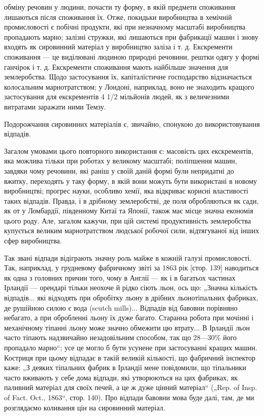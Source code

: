 обміну речовин у людини, почасти ту форму, в якій предмети
споживання лишаються після споживання їх. Отже, покидьки
виробництва в хемічній промисловості є побічні продукти, які
при незначному масштабі виробництва пропадають марно; залізні
стружки, які лишаються при фабрикації машин і знову входять
як сировинний матеріал у виробництво заліза і т. д. Екскременти споживання — це виділювані людиною
природні речовини,
рештки одягу у формі ганчірок і т. д. Екскременти споживання
мають найбільше значення для землеробства. Щодо застосування
їх, капіталістичне господарство відзначається колосальним марнотратством; у Лондоні, наприклад, воно
не знаходить кращого
застосування для екскрементів 4 1/2 мільйонів людей, як з величезними витратами заражати ними Темзу.

Подорожчання сировинних матеріалів є, звичайно, спонукою
до використовування відпадів.

Загалом умовами цього повторного використання є: масовість
цих екскрементів, яка можлива тільки при роботах у великому
масштабі; поліпшення машин, завдяки чому речовини, які раніш
у своїй даній формі були непридатні до вжитку, переходять
у таку форму, в якій вони можуть бути використані в новому
виробництві; прогрес науки, особливо хемії, яка відкриває корисні властивості таких відпадів.
Правда, і в дрібному землеробстві, де поля обробляються як сади, як от у Ломбардії, південному Китаї
та Японії, також має місце значна економія
цього роду. Але, загалом кажучи, при цій системі продуктивність землеробства купується великим
марнотратством людської робочої сили, відтягуваної від інших сфер виробництва.

Так звані відпади відіграють значну роль майже в кожній
галузі промисловості. Так, наприклад, у грудневому фабричному звіті за 1863 рік [стор. 139]
наводиться як одна з головних
причин того, чому в Англії — як і в багатьох частинах Ірландії —
орендарі тільки неохоче й рідко сіють льон, ось що: „Значна
кількість відпадів... які відходять при обробітку льону в дрібних льонотіпальних фабриках, де
рушійною силою є вода
(scutch mills)... Відпадів від бавовни порівняно небагато, а при
обробленні льону їх дуже багато. Старанна робота при мочінні і механічному тіпанні льону може значно
обмежити цю
втрату... В Ірландії льон часто тіпають надзвичайно незадовільним способом, так що 28—30\% його
пропадало марно“; усе це
могло б бути усунене при застосуванні кращих машин. Костриця при цьому відпадає в такій великій
кількості, що фабричний інспектор каже: „З деяких тіпальних фабрик в Ірландії
мене повідомили, що тіпальники часто вживають у себе дома
відпади, які утворюються на цих фабриках, як паливний матеріал для своїх печей, а це ж дуже цінний
матеріал“ („Rep. of
Insp. of Fact. Oct., 1863“, стор. 140). Про відпади бавовни мова
буде далі, там, де ми розглядаємо коливання цін на сировинний
матеріал.
